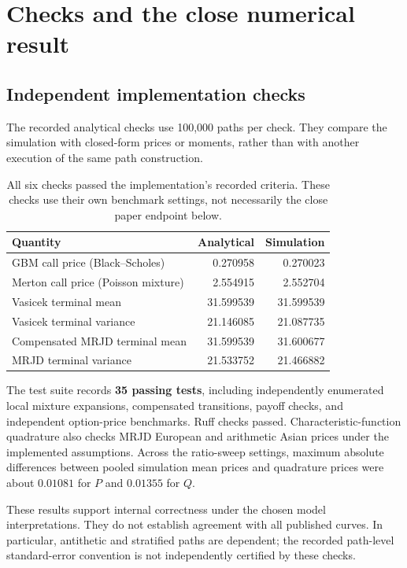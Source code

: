 \documentclass[11pt,a4paper]{article}
\begin{document}
\newpage
\section{Checks and the close numerical result}
\subsection{Independent implementation checks}
The recorded analytical checks use 100,000 paths per check. They compare
the simulation with closed-form prices or moments, rather than with
another execution of the same path construction.
\begin{table}[h]
\centering\small
\begin{tabular}{@{}p{73mm}rr@{}}
\toprule
Quantity & Analytical & Simulation\\
\midrule
GBM call price (Black--Scholes) & 0.270958 & 0.270023\\
Merton call price (Poisson mixture) & 2.554915 & 2.552704\\
Vasicek terminal mean & 31.599539 & 31.599539\\
Vasicek terminal variance & 21.146085 & 21.087735\\
Compensated MRJD terminal mean & 31.599539 & 31.600677\\
MRJD terminal variance & 21.533752 & 21.466882\\
\bottomrule
\end{tabular}
\caption{All six checks passed the implementation's recorded criteria.
These checks use their own benchmark settings, not necessarily the
close paper endpoint below.}
\end{table}

The test suite records \textbf{35 passing tests}, including independently
enumerated local mixture expansions, compensated transitions, payoff
checks, and independent option-price benchmarks. Ruff checks passed.
Characteristic-function quadrature also checks MRJD European and
arithmetic Asian prices under the implemented assumptions. Across the
ratio-sweep settings, maximum absolute differences between pooled
simulation mean prices and quadrature prices were about $0.01081$ for
$P$ and $0.01355$ for $Q$.

These results support internal correctness under the chosen model
interpretations. They do not establish agreement with all published
curves. In particular, antithetic and stratified paths are dependent;
the recorded path-level standard-error convention is not independently
certified by these checks.
\end{document}
